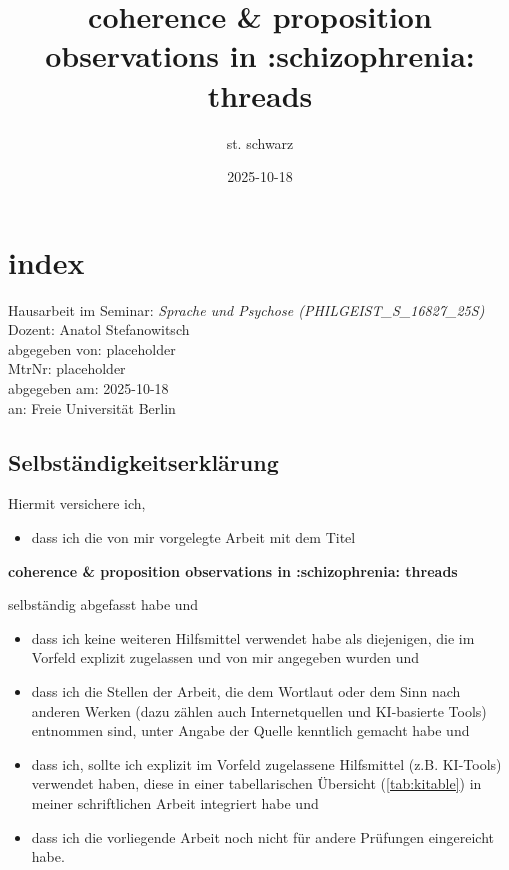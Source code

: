 \documentclass[
  12pt,
  oneside]{book}
\title{coherence \& proposition observations in :schizophrenia: threads}
\author{st. schwarz}
\date{2025-10-18}
\providecommand{\tightlist}{%
  \setlength{\itemsep}{0pt}\setlength{\parskip}{0pt}}
\begin{document}
\maketitle

{
\setcounter{tocdepth}{1}
\tableofcontents
}
\chapter{index}\label{index}

Hausarbeit im Seminar: \emph{Sprache und Psychose (PHILGEIST\_S\_16827\_25S)}\\
Dozent: Anatol Stefanowitsch\\
abgegeben von: placeholder\\
MtrNr: placeholder\\
abgegeben am: 2025-10-18\\
an: Freie Universität Berlin

\section{Selbständigkeitserklärung}\label{selbstuxe4ndigkeitserkluxe4rung}

Hiermit versichere ich,

\begin{itemize}
\tightlist
\item
  dass ich die von mir vorgelegte Arbeit mit dem Titel
\end{itemize}

\textbf{coherence \& proposition observations in :schizophrenia: threads}

selbständig abgefasst habe und

\begin{itemize}
\tightlist
\item
  dass ich keine weiteren Hilfsmittel verwendet habe als diejenigen, die im Vorfeld explizit zugelassen und von mir angegeben wurden und
\item
  dass ich die Stellen der Arbeit, die dem Wortlaut oder dem Sinn nach anderen Werken (dazu zählen auch Internetquellen und KI-basierte Tools) entnommen sind, unter Angabe der Quelle kenntlich gemacht habe und
\item
  dass ich, sollte ich explizit im Vorfeld zugelassene Hilfsmittel (z.B. KI-Tools) verwendet haben, diese in einer tabellarischen Übersicht (\ref{tab:kitable}) in meiner schriftlichen Arbeit integriert habe und
\item
  dass ich die vorliegende Arbeit noch nicht für andere Prüfungen eingereicht habe.
\end{itemize}
\end{document}
